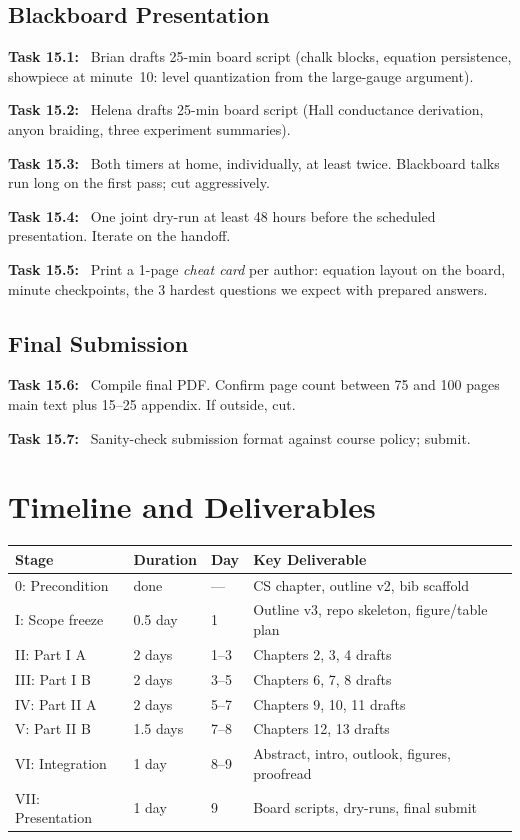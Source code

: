 \documentclass[11pt]{article}
\newcommand{\task}[1]{\medskip\noindent\textbf{Task #1:}\ }
\begin{document}
\subsection{Blackboard Presentation}

\task{15.1} Brian drafts 25-min board script (chalk blocks, equation persistence,
showpiece at minute~10: level quantization from the large-gauge argument).

\task{15.2} Helena drafts 25-min board script (Hall conductance derivation, anyon
braiding, three experiment summaries).

\task{15.3} Both timers at home, individually, at least twice. Blackboard talks run
long on the first pass; cut aggressively.

\task{15.4} One joint dry-run at least 48 hours before the scheduled presentation.
Iterate on the handoff.

\task{15.5} Print a 1-page \emph{cheat card} per author: equation layout on the board,
minute checkpoints, the 3 hardest questions we expect with prepared answers.

\subsection{Final Submission}

\task{15.6} Compile final PDF. Confirm page count between 75 and 100 pages main text
plus 15--25 appendix. If outside, cut.

\task{15.7} Sanity-check submission format against course policy; submit.

\section{Timeline and Deliverables}\label{sec:timeline}

\begin{center}\small
\begin{tabular}{@{}lllp{6cm}@{}}
\toprule
\textbf{Stage} & \textbf{Duration} & \textbf{Day} & \textbf{Key Deliverable} \\
\midrule
0: Precondition & done & --- & CS chapter, outline v2, bib scaffold \\
I: Scope freeze & 0.5 day & 1 & Outline v3, repo skeleton, figure/table plan \\
II: Part I A & 2 days & 1--3 & Chapters 2, 3, 4 drafts \\
III: Part I B & 2 days & 3--5 & Chapters 6, 7, 8 drafts \\
IV: Part II A & 2 days & 5--7 & Chapters 9, 10, 11 drafts \\
V: Part II B & 1.5 days & 7--8 & Chapters 12, 13 drafts \\
VI: Integration & 1 day & 8--9 & Abstract, intro, outlook, figures, proofread \\
VII: Presentation & 1 day & 9 & Board scripts, dry-runs, final submit \\
\bottomrule
\end{tabular}
\end{center}
\smallskip
\end{document}
